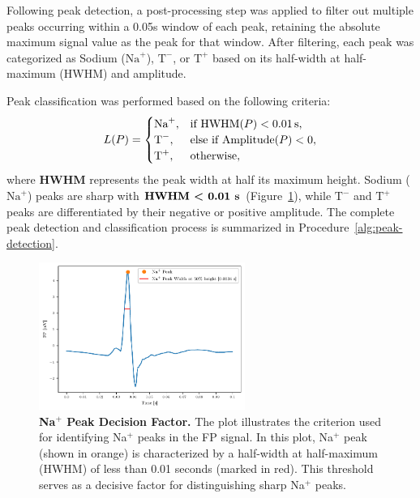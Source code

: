 \documentclass{report}
\begin{document}
            
            
            Following peak detection, a post-processing step was applied to filter out multiple peaks occurring within a 0.05s window of each peak, retaining the absolute maximum signal value as the peak for that window. After filtering, each peak was categorized as Sodium (\(\text{Na}^+\)), \(\text{T}^-\), or \(\text{T}^+\) based on its half-width at half-maximum (HWHM) and amplitude.
            
            Peak classification was performed based on the following criteria:
           \begin{equation}
            L(P) =
            \begin{cases} 
                \text{Na}^+, & \text{if HWHM}(P) < \text{\SI{0.01}{\s}}, \\
                \text{T}^-, & \text{else if Amplitude}(P) < 0, \\
                \text{T}^+, & \text{otherwise},
            \end{cases}
            \label{eq:peak-classification}
            \end{equation}
            where \textbf{HWHM} represents the peak width at half its maximum height. Sodium (\(\text{Na}^+\)) peaks are sharp with \(\textbf{HWHM < 0.01 \SI{}{\textbf{\s}}}\) (Figure~\ref{fig:fp-na-peak-width}), while \(\text{T}^-\) and \(\text{T}^+\) peaks are differentiated by their negative or positive amplitude. The complete peak detection and classification process is summarized in Procedure~\ref{alg:peak-detection}.

            \begin{figure}[H]
                \centering
                \includegraphics[width=0.6\textwidth, keepaspectratio]{plots/chapter_3/single-na-width-target-case.pdf}
                \caption[Na${^+}$ Peak Decision Factor]{\textbf{Na${^+}$ Peak Decision Factor.} The plot illustrates the criterion used for identifying Na${^+}$ peaks in the FP signal. In this plot, Na${^+}$ peak (shown in orange) is characterized by a half-width at half-maximum (HWHM) of less than 0.01 seconds (marked in red). This threshold serves as a decisive factor for distinguishing sharp Na${^+}$ peaks.}

                \label{fig:fp-na-peak-width}
            \end{figure}
            
\end{document}
